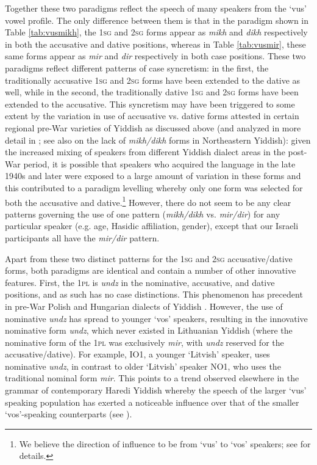 \documentclass[output=paper, hidelinks]{langscibook}
\begin{document}
Together these two paradigms reflect the speech of many speakers from the `vus’ vowel profile. The only difference between them is that in the paradigm shown in Table \ref{tab:vusmikh}, the 1\textsc{sg} and 2\textsc{sg} forms appear as \textit{mikh} and \textit{dikh} respectively in both the accusative and dative positions, whereas in Table \ref{tab:vusmir}, these same forms appear as \textit{mir} and \textit{dir} respectively in both case positions. These two paradigms reflect different patterns of case syncretism: in the first, the traditionally accusative 1\textsc{sg} and 2\textsc{sg} forms have been extended to the dative as well, while in the second, the traditionally dative 1\textsc{sg} and 2\textsc{sg} forms have been extended to the accusative. This syncretism may have been triggered to some extent by the variation in use of accusative vs. dative forms attested in certain regional pre-War varieties of Yiddish as discussed above (and analyzed in more detail in \citet[142--147]{Wolf69}; see also \citet{Jacobs05} on the lack of \textit{mikh/dikh} forms in Northeastern Yiddish): given the increased mixing of speakers from different Yiddish dialect areas in the post-War period, it is possible that speakers who acquired the language in the late 1940s and later were exposed to a large amount of variation in these forms and this contributed to a paradigm levelling whereby only one form was selected for both the accusative and dative.\footnote{We believe the direction of influence to be from `vus' to `vos' speakers; see \citet{Author21} for details.} However, there do not seem to be any clear patterns governing the use of one pattern (\textit{mikh/dikh} vs. \textit{mir/dir}) for any particular speaker (e.g. age, Hasidic affiliation, gender), except that our Israeli participants all have the \textit{mir/dir} pattern. 

Apart from these two distinct patterns for the 1\textsc{sg} and 2\textsc{sg} accusative/dative forms, both paradigms are identical and contain a number of other innovative features. First, the 1\textsc{pl} is \textit{undz} in the nominative, accusative, and dative positions, and as such has no case distinctions. This phenomenon has precedent in pre-War Polish and Hungarian dialects of Yiddish \citep[70]{Weinreich64, Jacobs05}. However, the use of nominative \textit{undz} has spread to younger ‘vos’ speakers, resulting in the innovative nominative form \textit{undz}, which never existed in Lithuanian Yiddish (where the nominative form of the 1\textsc{pl} was exclusively \textit{mir}, with \textit{undz} reserved for the accusative/dative). For example, IO1, a younger ‘Litvish’ speaker, uses nominative \textit{undz}, in contrast to older ‘Litvish’ speaker NO1, who uses the traditional nominal form \textit{mir}. This points to a trend observed elsewhere in the grammar of contemporary Haredi Yiddish whereby the speech of the larger ‘vus’ speaking population has exerted a noticeable influence over that of the smaller ‘vos’-speaking counterparts (see \citealt{Author21}). 
\end{document}
